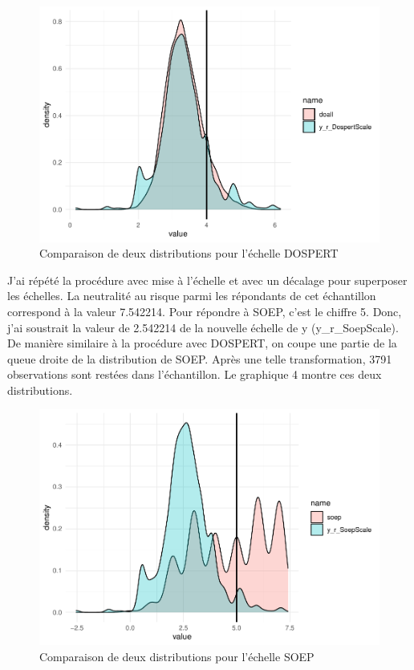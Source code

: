 \documentclass[12pt]{article}
\begin{document}
\begin{figure}
\centering
\includegraphics{Report-de-stage_PC_files/figure-latex/distdospert-1}
\caption{Comparaison de deux distributions pour l'échelle DOSPERT}
\end{figure}

J'ai répété la procédure avec mise à l'échelle et avec un décalage pour
superposer les échelles. La neutralité au risque parmi les répondants de
cet échantillon correspond à la valeur 7.542214. Pour répondre à SOEP,
c'est le chiffre 5. Donc, j'ai soustrait la valeur de 2.542214 de la
nouvelle échelle de y (y\_r\_SoepScale). De manière similaire à la
procédure avec DOSPERT, on coupe une partie de la queue droite de la
distribution de SOEP. Après une telle transformation, 3791 observations
sont restées dans l'échantillon. Le graphique 4 montre ces deux
distributions.

\begin{figure}
\centering
\includegraphics{Report-de-stage_PC_files/figure-latex/distsoep-1}
\caption{Comparaison de deux distributions pour l'échelle SOEP}
\end{figure}
\end{document}
